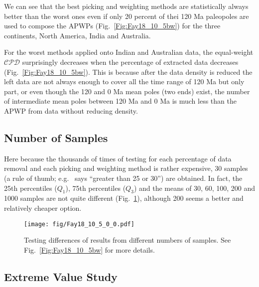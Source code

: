 We can see that the best picking and weighting methods are statistically always
better than the worst ones even if only 20 percent of thei 120 Ma
paleopoles are used to compose the APWPs (Fig.~\ref{Fig:Fay18_10_5bw}) for the
three continents, North America, India and Australia.

For the worst methods applied onto Indian and Australian data, the equal-weight
$\mathcal{CPD}$ surprisingly decreases when the percentage of extracted data
decreases (Fig.~\ref{Fig:Fay18_10_5bw}). This is because after the data density
is reduced the left data are not always enough to cover all the time range of
120 Ma but only part, or even though the 120 and 0 Ma mean poles
(two ends) exist, the number of intermediate mean poles between 120 Ma and 0 Ma
is much less than the APWP from data without reducing density.

\subsection{Number of Samples}
Here because the thousands of times of testing for each percentage of data
removal and each picking and weighting method is rather expensive, 30 samples
(a rule of thumb; e.g.~\cite{H19} says ``greater than 25 or 30'') are obtained.
In fact, the 25th percentiles ($Q_1$), 75th percentiles ($Q_3$) and the means of
30, 60, 100, 200 and 1000 samples are not quite different
(Fig.~\ref{Fig:Fay18_10_5_0_0}), although 200 seems a better and relatively
cheaper option.

\begin{figure}
    \centering
        \texttt{[image: fig/Fay18\_10\_5\_0\_0.pdf]}
    \captionsetup{width=.95\textwidth}
    \caption{Testing differences of results from different numbers of samples.
	See Fig.~\ref{Fig:Fay18_10_5bw} for more details.}\label{Fig:Fay18_10_5_0_0}
\end{figure}


\subsection{Extreme Value Study}

